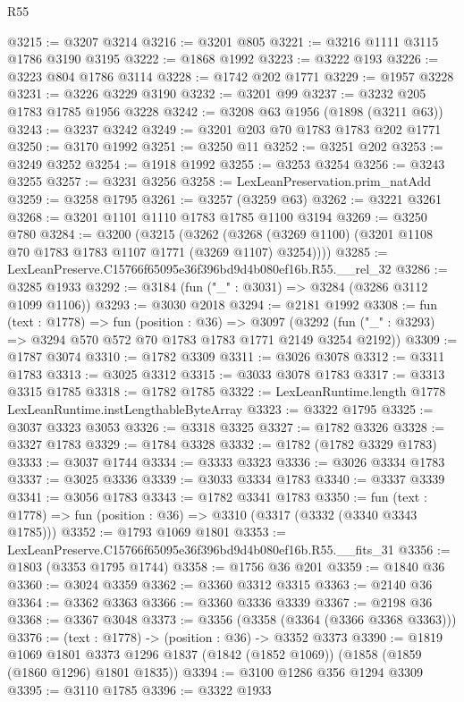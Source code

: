 \begin{lexlean}{R55}
\begin{coremodule}
@3215 := @3207 @3214
@3216 := @3201 @805
@3221 := @3216 @1111 @3115 @1786 @3190 @3195
@3222 := @1868 @1992
@3223 := @3222 @193
@3226 := @3223 @804 @1786 @3114
@3228 := @1742 @202 @1771
@3229 := @1957 @3228
@3231 := @3226 @3229 @3190
@3232 := @3201 @99
@3237 := @3232 @205 @1783 @1785 @1956 @3228
@3242 := @3208 @63 @1956 (@1898 (@3211 @63))
@3243 := @3237 @3242
@3249 := @3201 @203 @70 @1783 @1783 @202 @1771
@3250 := @3170 @1992
@3251 := @3250 @11
@3252 := @3251 @202
@3253 := @3249 @3252
@3254 := @1918 @1992
@3255 := @3253 @3254
@3256 := @3243 @3255
@3257 := @3231 @3256
@3258 := LexLeanPreservation.prim_natAdd
@3259 := @3258 @1795
@3261 := @3257 (@3259 @63)
@3262 := @3221 @3261
@3268 := @3201 @1101 @1110 @1783 @1785 @1100 @3194
@3269 := @3250 @780
@3284 := @3200
    (@3215
      (@3262 (@3268 (@3269 @1100) (@3201 @1108 @70 @1783 @1783 @1107 @1771 (@3269 @1107) @3254))))
@3285 := LexLeanPreserve.C15766f65095e36f396bd9d4b080ef16b.R55.__rel_32
@3286 := @3285 @1933
@3292 := @3184 (fun ("_" : @3031) => @3284 (@3286 @3112 @1099 @1106))
@3293 := @3030 @2018
@3294 := @2181 @1992
@3308 := fun (text : @1778) =>
  fun (position : @36) =>
  @3097 (@3292 (fun ("_" : @3293) => @3294 @570 @572 @70 @1783 @1783 @1771 @2149 @3254 @2192))
@3309 := @1787 @3074
@3310 := @1782 @3309
@3311 := @3026 @3078
@3312 := @3311 @1783
@3313 := @3025 @3312
@3315 := @3033 @3078 @1783
@3317 := @3313 @3315 @1785
@3318 := @1782 @1785
@3322 := LexLeanRuntime.length @1778 LexLeanRuntime.instLengthableByteArray
@3323 := @3322 @1795
@3325 := @3037 @3323 @3053
@3326 := @3318 @3325
@3327 := @1782 @3326
@3328 := @3327 @1783
@3329 := @1784 @3328
@3332 := @1782 (@1782 @3329 @1783)
@3333 := @3037 @1744
@3334 := @3333 @3323
@3336 := @3026 @3334 @1783
@3337 := @3025 @3336
@3339 := @3033 @3334 @1783
@3340 := @3337 @3339
@3341 := @3056 @1783
@3343 := @1782 @3341 @1783
@3350 := fun (text : @1778) => fun (position : @36) => @3310 (@3317 (@3332 (@3340 @3343 @1785)))
@3352 := @1793 @1069 @1801
@3353 := LexLeanPreserve.C15766f65095e36f396bd9d4b080ef16b.R55.__fits_31
@3356 := @1803 (@3353 @1795 @1744)
@3358 := @1756 @36 @201
@3359 := @1840 @36
@3360 := @3024 @3359
@3362 := @3360 @3312 @3315
@3363 := @2140 @36
@3364 := @3362 @3363
@3366 := @3360 @3336 @3339
@3367 := @2198 @36
@3368 := @3367 @3048
@3373 := @3356 (@3358 (@3364 (@3366 @3368 @3363)))
@3376 := (text : @1778) -> (position : @36) -> @3352 @3373
@3390 := @1819
    @1069
    @1801
    @3373
    @1296
    @1837
    (@1842 (@1852 @1069))
    (@1858 (@1859 (@1860 @1296) @1801 @1835))
@3394 := @3100 @1286 @356 @1294 @3309
@3395 := @3110 @1785
@3396 := @3322 @1933

\end{coremodule}
\end{lexlean}
